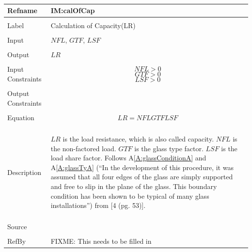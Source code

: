 \documentclass[12pt]{article}
\begin{document}
~\newline
\noindent \begin{minipage}{\textwidth}
\begin{tabular}{p{} p{}}
\toprule \textbf{Refname} & \textbf{IM:calOfCap}
\label{IM:calOfCap}
\\ \midrule \\
Label & Calculation of Capacity(LR)
\\ \midrule \\
Input & $NFL$, $GTF$, $LSF$
\\ \midrule \\
Output & $LR$
\\ \midrule \\
Input Constraints & \begin{dmath}
                    NFL>0
                    \end{dmath}
                    \begin{dmath}
                    GTF>0
                    \end{dmath}
                    \begin{dmath}
                    LSF>0
                    \end{dmath}
\\ \midrule \\
Output Constraints & 
\\ \midrule \\
Equation & \begin{dmath}
           LR=NFL GTF LSF
           \end{dmath}
\\ \midrule \\
Description & \begin{description}
$LR$ is the load resistance, which is also called capacity. $NFL$ is the non-factored load. $GTF$ is the glass type factor. $LSF$ is the load share factor. Follows A\ref{A:glassConditionA} and A\ref{A:glassTyA} (``In the development of this procedure, it was assumed that all four edges of the glass are simply supported and free to slip in the plane of the glass. This boundary condition has been shown to be typical of many glass installations'') from [4 (pg. 53)].
              \end{description}
\\ \midrule \\
Source & 
\\ \midrule \\
RefBy & FIXME: This needs to be filled in
\\ \bottomrule \end{tabular}
\end{minipage}\\
\end{document}
